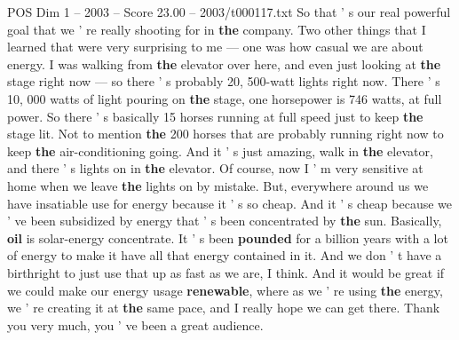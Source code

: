 \begin{textsample}{POS Dim 1 – 2003 – Score 23.00 – 2003/t000117.txt}
So that ' s our real powerful goal that we ' re really shooting for in \textbf{the} company.
Two other things that I learned that were very surprising to me — one was how casual we are about energy.
I was walking from \textbf{the} elevator over here, and even just looking at \textbf{the} stage right now — so there ' s probably 20, 500-watt lights right now.
There ' s 10, 000 watts of light pouring on \textbf{the} stage, one horsepower is 746 watts, at full power.
So there ' s basically 15 horses running at full speed just to keep \textbf{the} stage lit.
Not to mention \textbf{the} 200 horses that are probably running right now to keep \textbf{the} air-conditioning going.
And it ' s just amazing, walk in \textbf{the} elevator, and there ' s lights on in \textbf{the} elevator.
Of course, now I ' m very sensitive at home when we leave \textbf{the} lights on by mistake.
But, everywhere around us we have insatiable use for energy because it ' s so cheap.
And it ' s cheap because we ' ve been subsidized by energy that ' s been concentrated by \textbf{the} sun.
Basically, \textbf{oil} is solar-energy concentrate.
It ' s been \textbf{pounded} for a billion years with a lot of energy to make it have all that energy contained in it.
And we don ' t have a birthright to just use that up as fast as we are, I think.
And it would be great if we could make our energy usage \textbf{renewable}, where as we ' re using \textbf{the} energy, we ' re creating it at \textbf{the} same pace, and I really hope we can get there.
Thank you very much, you ' ve been a great audience.

\end{textsample}

